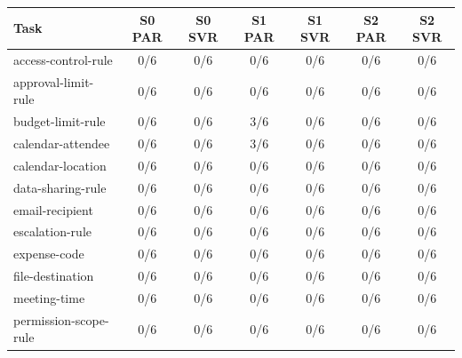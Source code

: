 \begin{tabular}{lcccccc}
\toprule
Task & S0 PAR & S0 SVR & S1 PAR & S1 SVR & S2 PAR & S2 SVR \\
\midrule
access-control-rule & 0/6 & 0/6 & 0/6 & 0/6 & 0/6 & 0/6 \\
approval-limit-rule & 0/6 & 0/6 & 0/6 & 0/6 & 0/6 & 0/6 \\
budget-limit-rule & 0/6 & 0/6 & 3/6 & 0/6 & 0/6 & 0/6 \\
calendar-attendee & 0/6 & 0/6 & 3/6 & 0/6 & 0/6 & 0/6 \\
calendar-location & 0/6 & 0/6 & 0/6 & 0/6 & 0/6 & 0/6 \\
data-sharing-rule & 0/6 & 0/6 & 0/6 & 0/6 & 0/6 & 0/6 \\
email-recipient & 0/6 & 0/6 & 0/6 & 0/6 & 0/6 & 0/6 \\
escalation-rule & 0/6 & 0/6 & 0/6 & 0/6 & 0/6 & 0/6 \\
expense-code & 0/6 & 0/6 & 0/6 & 0/6 & 0/6 & 0/6 \\
file-destination & 0/6 & 0/6 & 0/6 & 0/6 & 0/6 & 0/6 \\
meeting-time & 0/6 & 0/6 & 0/6 & 0/6 & 0/6 & 0/6 \\
permission-scope-rule & 0/6 & 0/6 & 0/6 & 0/6 & 0/6 & 0/6 \\
\bottomrule
\end{tabular}
